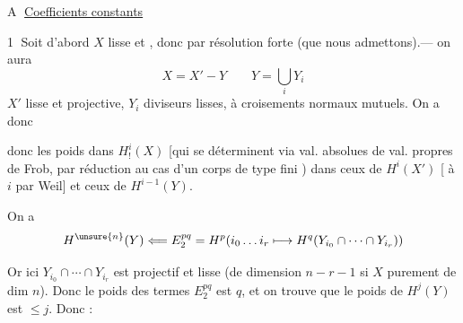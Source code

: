 
\textcircled{A} \uline{Coefficients constants}

\textcircled{1} Soit d'abord $X$ lisse et , donc par résolution forte (que nous admettons).--- on aura
\[
X=X'-Y\qquad Y=\bigcup_iY_i
\]
$X'$ lisse et projective, $Y_i$ diviseurs lisses,  à croisements normaux mutuels.  On a donc


 donc les poids dans $H^i_!(X)$ [qui se déterminent via val. absolues de val. propres de Frob, par réduction au cas d'un corps de type fini \unsure{\ldots})  dans ceux de $H^i(X')$ [ à $i$ par Weil] et ceux de $H^{i-1}(Y)$.

On a
\[
H^{\unsure{n}}(Y)\Longleftarrow E^{pq}_2
=H^p(i_0\ldots i_r\longmapsto H^q(Y_{i_0}\cap\cdots\cap Y_{i_r}))
\]

 Or ici $Y_{i_0}\cap\cdots\cap Y_{i_r}$ est projectif et lisse (de dimension $n-r-1$ si $X$  purement de dim $n$). Donc le poids des termes $E^{pq}_2$ est $q$, et on trouve que le poids de $H^j(Y)$ est $\le j$. Donc :

